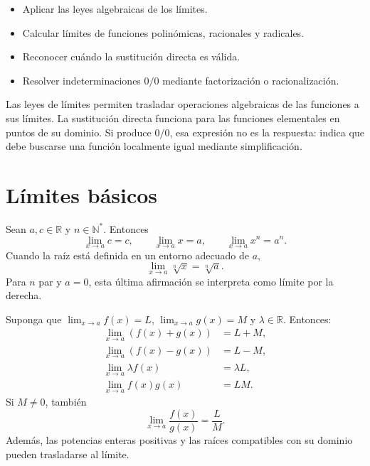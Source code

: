 \ifdefined\documentoSemanal
\else
\usepackage{tikz}
\usepackage{estilo_apuntes}
\usetikzlibrary{babel}

\fi

\ifdefined\documentoSemanal
\else
{}

\begin{objetivos}
\begin{itemize}
  \item Aplicar las leyes algebraicas de los límites.
  \item Calcular límites de funciones polinómicas, racionales y radicales.
  \item Reconocer cuándo la sustitución directa es válida.
  \item Resolver indeterminaciones $0/0$ mediante factorización o racionalización.
\end{itemize}
\end{objetivos}

\begin{resumen}
Las leyes de límites permiten trasladar operaciones algebraicas de las funciones a sus límites. La sustitución directa funciona para las funciones elementales en puntos de su dominio. Si produce $0/0$, esa expresión no es la respuesta: indica que debe buscarse una función localmente igual mediante simplificación.
\end{resumen}
\fi

\section*{Límites básicos}

\begin{proposicion}
Sean $a,c\in\mathbb{R}$ y $n\in\mathbb{N}^{*}$. Entonces
\[
\lim_{x\to a}c=c,\qquad
\lim_{x\to a}x=a,\qquad
\lim_{x\to a}x^n=a^n.
\]
Cuando la raíz está definida en un entorno adecuado de $a$,
\[
\lim_{x\to a}\sqrt[n]{x}=\sqrt[n]{a}.
\]
Para $n$ par y $a=0$, esta última afirmación se interpreta como límite por la derecha.
\end{proposicion}

\begin{teorema}
Suponga que $\lim_{x\to a}f(x)=L$, $\lim_{x\to a}g(x)=M$ y $\lambda\in\mathbb{R}$. Entonces:
\begin{align*}
\lim_{x\to a}(f(x)+g(x))&=L+M,\\
\lim_{x\to a}(f(x)-g(x))&=L-M,\\
\lim_{x\to a}\lambda f(x)&=\lambda L,\\
\lim_{x\to a}f(x)g(x)&=LM.
\end{align*}
Si $M\neq0$, también
\[
\lim_{x\to a}\frac{f(x)}{g(x)}=\frac{L}{M}.
\]
Además, las potencias enteras positivas y las raíces compatibles con su dominio pueden trasladarse al límite.
\end{teorema}

